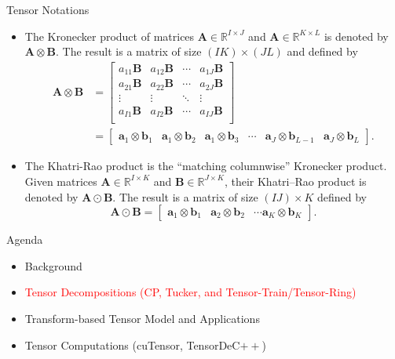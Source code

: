 \documentclass[t, 10pt, handout, aspectratio=169]{beamer}
\begin{document}
\begin{frame}{Tensor Notations}
\begin{itemize}
\item The Kronecker product of matrices $\mathbf{A}\in\mathbb{R}^{I\times J}$ and $\mathbf{A}\in\mathbb{R}^{K\times L}$ is denoted by $\mathbf{A} \otimes \mathbf{B}$.  The result is a matrix of size $(IK) \times (JL)$ and defined by
$$
\begin{aligned}
\mathbf{A} \otimes \mathbf{B} &= 
\left[\begin{matrix}
a_{11}\mathbf{B} & a_{12}\mathbf{B} & \cdots & a_{1J}\mathbf{B}\\
a_{21}\mathbf{B} & a_{22}\mathbf{B} & \cdots & a_{2J}\mathbf{B}\\
\vdots & \vdots & \ddots & \vdots\\
a_{I1}\mathbf{B} & a_{I2}\mathbf{B} & \cdots & a_{IJ}\mathbf{B}\\
\end{matrix}\right] \\
&=
\left[\begin{matrix}
\mathbf{a}_1\otimes\mathbf{b}_1 & \mathbf{a}_1\otimes\mathbf{b}_2 & \mathbf{a}_1\otimes\mathbf{b}_3 & \cdots & \mathbf{a}_J\otimes\mathbf{b}_{L-1} & \mathbf{a}_J\otimes\mathbf{b}_L
\end{matrix}\right].
\end{aligned}
$$
\item The Khatri-Rao product is the ``matching columnwise'' Kronecker product. Given matrices $\mathbf{A} \in \mathbb{R}^{I\times K}$ and $\mathbf{B} \in \mathbb{R}^{J\times K}$, their Khatri–Rao product is denoted by $\mathbf{A} \odot \mathbf{B}$. The result is a matrix of size $(IJ) \times K$ defined by
$$
\mathbf{A}\odot\mathbf{B}=
\left[\begin{matrix}
\mathbf{a}_1\otimes\mathbf{b}_1 & \mathbf{a}_2\otimes\mathbf{b}_2 & \cdots \mathbf{a}_K\otimes\mathbf{b}_K
\end{matrix}\right].
$$
\end{itemize}
\end{frame}

\begin{frame}{Agenda}
\begin{itemize}
    \large \item {Background}
    \large \item \textcolor{red}{Tensor Decompositions (CP, Tucker, and Tensor-Train/Tensor-Ring)}
    \large \item{Transform-based Tensor Model and Applications}
    \large \item{Tensor Computations (cuTensor, TensorDeC$++$)}
\end{itemize}
\end{frame}
\end{document}
